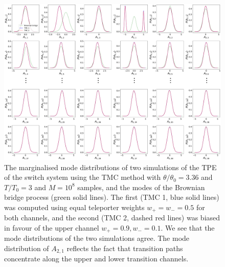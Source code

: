 \begin{figure}[t]
\includegraphics[width=1\textwidth]{figs_part1/mcmc/switch_mode_convergence}
\centering \caption{The marginalised mode distributions of two simulations of the TPE of the switch system using the TMC method with $\theta/\theta_{0}=3.36$ and $T/T_{0}=3$ and $M=10^8$ samples, and the modes of the Brownian bridge process (green solid lines). The first (TMC 1, blue solid lines) was computed using equal teleporter weights $w_+ = w_- = 0.5$ for both channels, and the second (TMC 2, dashed red lines) was biased in favour of the upper channel $w_+ = 0.9, w_- = 0.1$. We see that the mode distributions of the two simulations agree. The mode distribution of $A_{2,1}$ reflects the fact that transition paths concentrate along the upper and lower transition channels.}
\label{fig:switch modes marginalised} 
\end{figure}

